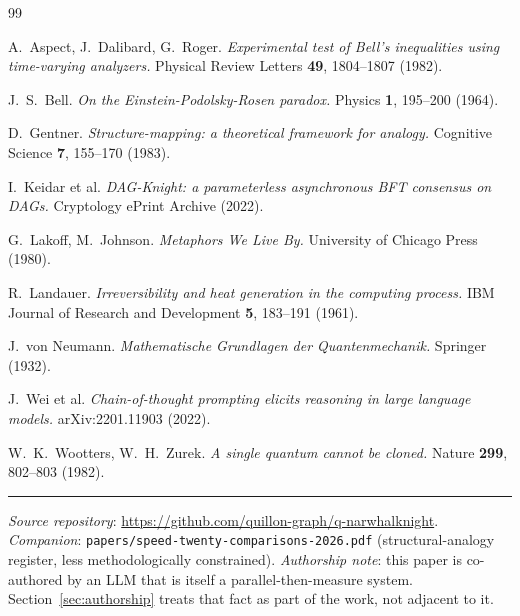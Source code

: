 \documentclass[11pt,a4paper]{article}
\begin{document}
\begin{thebibliography}{99}

 A.\ Aspect, J.\ Dalibard, G.\ Roger. \emph{Experimental
test of Bell's inequalities using time-varying analyzers.} Physical Review
Letters \textbf{49}, 1804--1807 (1982).

 J.\ S.\ Bell. \emph{On the Einstein-Podolsky-Rosen
paradox.} Physics \textbf{1}, 195--200 (1964).

 D.\ Gentner. \emph{Structure-mapping: a theoretical
framework for analogy.} Cognitive Science \textbf{7}, 155--170 (1983).

 I.\ Keidar et al. \emph{DAG-Knight: a parameterless
asynchronous BFT consensus on DAGs.} Cryptology ePrint Archive (2022).

 G.\ Lakoff, M.\ Johnson. \emph{Metaphors We Live By.}
University of Chicago Press (1980).

 R.\ Landauer. \emph{Irreversibility and heat
generation in the computing process.} IBM Journal of Research and
Development \textbf{5}, 183--191 (1961).

 J.\ von Neumann. \emph{Mathematische Grundlagen
der Quantenmechanik.} Springer (1932).

 J.\ Wei et al. \emph{Chain-of-thought prompting
elicits reasoning in large language models.} arXiv:2201.11903 (2022).

 W.\ K.\ Wootters, W.\ H.\ Zurek. \emph{A single
quantum cannot be cloned.} Nature \textbf{299}, 802--803 (1982).

\end{thebibliography}

\bigskip
\hrule
\medskip
\small\textit{Source repository}: \url{https://github.com/quillon-graph/q-narwhalknight}.
\textit{Companion}: \texttt{papers/speed-twenty-comparisons-2026.pdf}
(structural-analogy register, less methodologically constrained).
\textit{Authorship note}: this paper is co-authored by an LLM that is
itself a parallel-then-measure system. Section~\ref{sec:authorship}
treats that fact as part of the work, not adjacent to it.
\end{document}
